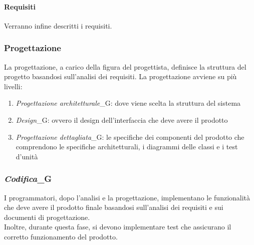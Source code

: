 \paragraph{Requisiti} 
Verranno infine descritti i requisiti.
\subsubsection{Progettazione}
La progettazione, a carico della figura del progettista, definisce la struttura del progetto basandosi sull'analisi dei requisiti.
La progettazione avviene su più livelli:
\begin{enumerate}
    \item \textit{Progettazione architetturale}_G: dove viene scelta la struttura del sistema
    \item \textit{Design}_G: ovvero il design dell'interfaccia che deve avere il prodotto
    \item \textit{Progettazione dettagliata}_G: le specifiche dei componenti del prodotto che comprendono le specifiche architetturali, i diagrammi delle classi e i test d'unità
\end{enumerate}
\subsubsection{\textit{Codifica}_G}
I programmatori, dopo l'analisi e la progettazione, implementano le funzionalità che deve avere il prodotto finale basandosi sull'analisi dei requisiti e sui documenti di progettazione.\\
Inoltre, durante questa fase, si devono implementare test che assicurano il corretto funzionamento del prodotto.
